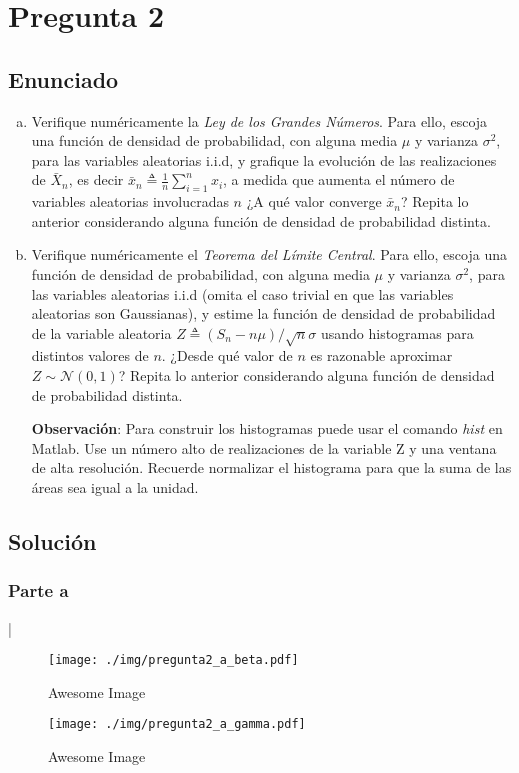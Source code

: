\section{ Pregunta 2 }
	\subsection{ Enunciado }
		\begin{enumerate}[a)]
			\item Verifique numéricamente la \textit{Ley de los Grandes Números}. Para ello, escoja una función de densidad de probabilidad, con alguna media $\mu$ y varianza $\sigma^2$, para las variables aleatorias i.i.d, y grafique la evolución de las realizaciones de $\bar X_n$, es decir $\bar x_n \triangleq \frac{1}{n}\sum_{i=1}^n x_i$, a medida que aumenta el número de variables aleatorias involucradas $n$ ¿A qué valor converge $\bar x_n$? Repita lo anterior considerando alguna función de densidad de probabilidad distinta.


			\item Verifique numéricamente el \textit{Teorema del Límite Central}. Para ello, escoja una función de densidad de probabilidad, con alguna media $\mu$ y varianza $\sigma^2$, para las variables aleatorias i.i.d (omita el caso trivial en que las variables aleatorias son Gaussianas), y estime la función de densidad de probabilidad de la variable aleatoria $Z\triangleq (S_n -n\mu)/\sqrt{n}\sigma$ usando histogramas para distintos valores de $n$. ¿Desde qué valor de $n$ es razonable aproximar $Z \sim \mathcal{ N } (0, 1)$? Repita lo anterior considerando alguna función de densidad de probabilidad distinta.

			\textbf{Observación}: Para construir los histogramas puede usar el comando \textit{hist} en Matlab. Use un número alto de realizaciones de la variable Z y  una ventana de alta resolución. Recuerde normalizar el histograma para que la suma de las áreas sea igual a la unidad. 
		\end{enumerate}

	\subsection{ Solución }

		\subsubsection {Parte a}
		|

			\begin{figure}[H]
			    \centering
			    \texttt{[image: ./img/pregunta2\_a\_beta.pdf]}
			    \caption{Awesome Image}
			    \label{fig:2_a_beta}
			\end{figure}
			\begin{figure}[H]
			    \centering
			    \texttt{[image: ./img/pregunta2\_a\_gamma.pdf]}
			    \caption{Awesome Image}
			    \label{fig:2_a_gamma}
			\end{figure}